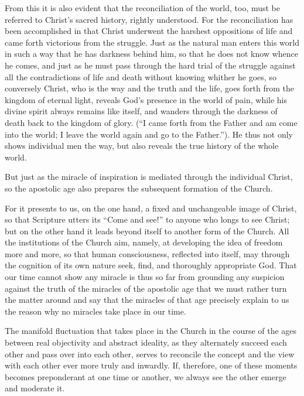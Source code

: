 \documentclass[12pt]{book}
\newcommand{\opage}[1]{\marginnote{\footnotesize\textit{[#1]}}}
\begin{document}
From this it is also evident that the reconciliation of the world, too, must be
referred to Christ's sacred history, rightly understood. For the reconciliation
has been accomplished in that Christ underwent the harshest oppositions of life
and came forth victorious from the struggle. Just as the natural man enters this
world in such a way that he has darkness behind him, so that he does not know
whence he comes, and just as he must pass through the hard trial of the struggle
against all the contradictions of life and death without knowing whither he
goes, so conversely Christ, who is the way and the truth and the life, goes forth
from the kingdom of eternal light, reveals God's presence in the world of pain,
while his divine spirit always remains like itself, and wanders through the
darkness of death back to the kingdom of glory. (``I came forth from the Father
and am come into the world; I leave the world again and go to the Father.''). He
thus not only shows individual men the way, but also reveals the true history of
the whole world.

But just as the miracle of inspiration is mediated through the individual Christ,
so the apostolic age also prepares the subsequent formation of the Church.

For it presents to us, on the one hand, a fixed and
\opage{156} unchangeable image of Christ, so that Scripture utters its ``Come and
see!'' to anyone who longs to see Christ; but on the other hand it leads beyond
itself to another form of the Church. All the institutions of the Church aim,
namely, at developing the idea of freedom more and more, so that human
consciousness, reflected into itself, may through the cognition of its own nature
seek, find, and thoroughly appropriate God. That our time cannot show any miracle
is thus so far from grounding any suspicion against the truth of the miracles of
the apostolic age that we must rather turn the matter around and say that the
miracles of that age precisely explain to us the reason why no miracles take
place in our time.

The manifold fluctuation that takes place in the Church in the course of the ages
between real objectivity and abstract ideality, as they alternately succeed each
other and pass over into each other, serves to reconcile the concept and the view
with each other ever more truly and inwardly. If, therefore, one of these moments
becomes preponderant at one time or another, we always see the other emerge and
moderate it.
\end{document}
